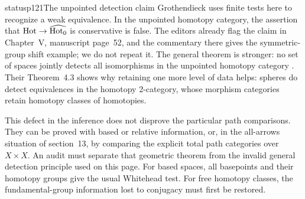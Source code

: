 \begin{dcomment}{status}{p121}{The unpointed detection claim}
Grothendieck uses finite tests here to recognize a weak equivalence. In the unpointed homotopy category, the assertion that $\mathrm{Hot}\to\widehat{\mathrm{Hot}_0}$ is conservative is false. The editors already flag the claim in Chapter~V, manuscript page~52, and the commentary there gives the symmetric-group shift example; we do not repeat it. The general theorem is stronger: no set of spaces jointly detects all isomorphisms in the unpointed homotopy category \citep[Theorem~2.1]{ArlinChristensen2023}. Their Theorem~4.3 shows why retaining one more level of data helps: spheres do detect equivalences in the homotopy 2-category, whose morphism categories retain homotopy classes of homotopies.

This defect in the inference does not disprove the particular path comparisons. They can be proved with based or relative information, or, in the all-arrows situation of section~13, by comparing the explicit total path categories over $X\times X$. An audit must separate that geometric theorem from the invalid general detection principle used on this page. For based spaces, all basepoints and their homotopy groups give the usual Whitehead test. For free homotopy classes, the fundamental-group information lost to conjugacy must first be restored.
\end{dcomment}


